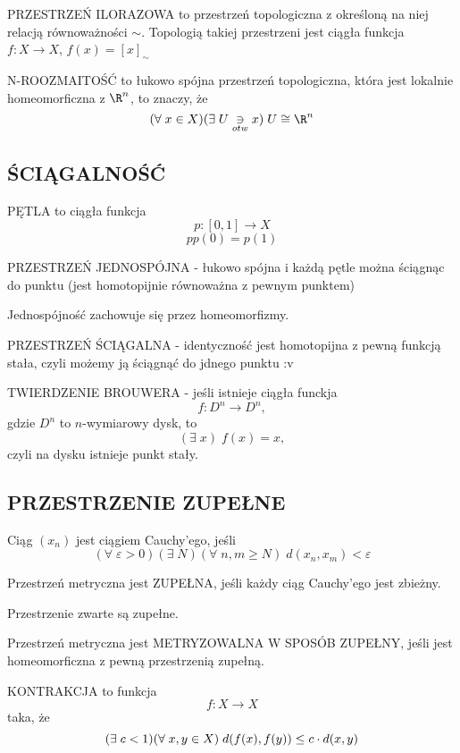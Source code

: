 \documentclass{article}
\begin{document}
    {\large\color{def}PRZESTRZEŃ ILORAZOWA} to przestrzeń topologiczna z określoną na niej relacją równoważności $\sim$. Topologią takiej przestrzeni jest ciągła funkcja $f:X\to X$, $f(x)=[x]_\sim$\bigskip

    {\large\color{def}N-ROOZMAITOŚĆ} to łukowo spójna przestrzeń topologiczna, która jest lokalnie homeomorficzna z $\R^n$, to znaczy, że
    $$(\forall\;x\in X)(\exists\;U\underset{otw}\ni x)\;U\cong \R^n$$

\subsection{ŚCIĄGALNOŚĆ}

    {\large\color{def}PĘTLA} to ciągła funkcja
    $$p:[0, 1]\to X$$
    $$pp(0)=p(1)$$

    {\large\color{def}PRZESTRZEŃ JEDNOSPÓJNA} - łukowo spójna i każdą pętle można ściągnąc do punktu (jest {\color{acc}homotopijnie równoważna z pewnym punktem})\bigskip

    Jednospójność zachowuje się przez {\color{acc}homeomorfizmy}.\bigskip

    {\large\color{def}PRZESTRZEŃ ŚCIĄGALNA} - identyczność jest homotopijna z pewną funkcją stała, czyli możemy ją {\color{acc}ściągnąć do jdnego punktu :v}\bigskip

    {\large\color{def}TWIERDZENIE BROUWERA} - jeśli istnieje ciągła funckja
    $$f:D^n\to D^n,$$
    gdzie $D^n$ to $n$-wymiarowy dysk, to
    $$(\exists\;x)\;f(x)=x,$$
    czyli na dysku istnieje punkt stały.

\subsection{PRZESTRZENIE ZUPEŁNE}
    Ciąg $(x_n)$ jest {\large\color{def}ciągiem Cauchy'ego}, jeśli
    $$(\forall\;\varepsilon>0)(\exists\;N)(\forall\;n, m\geq N)\;d(x_n, x_m)<\varepsilon$$

    Przestrzeń metryczna jest {\large\color{def}ZUPEŁNA}, jeśli każdy ciąg Cauchy'ego jest zbieżny.\bigskip

    Przestrzenie {\color{acc}zwarte są zupełne}.\bigskip

    Przestrzeń metryczna jest {\color{def}METRYZOWALNA W SPOSÓB ZUPEŁNY}, jeśli jest homeomorficzna z pewną przestrzenią zupełną.\bigskip

    {\large\color{def}KONTRAKCJA} to funkcja
    $$f:X\to X$$
    taka, że
    $$(\exists\;c<1)(\forall\;x, y\in X)\;d(f(x), f(y))\leq c\cdot d(x, y)\bigskip$$
\end{document}
